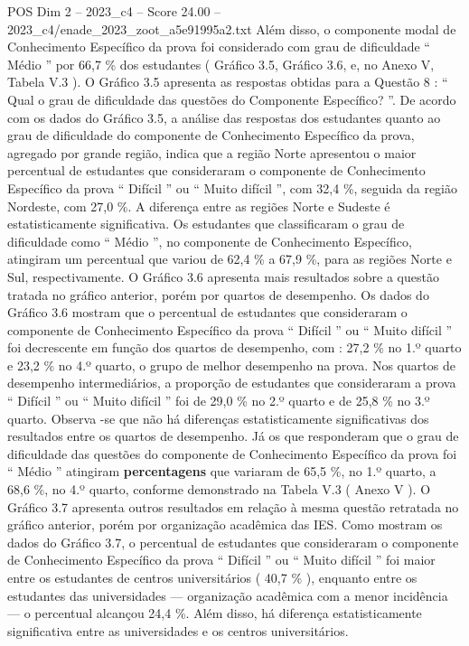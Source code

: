 \begin{textsample}{POS Dim 2 – 2023\_c4 – Score 24.00 – 2023\_c4/enade\_2023\_zoot\_a5e91995a2.txt}
Além disso, o componente modal de Conhecimento Específico da prova foi considerado com grau de dificuldade “ Médio ” por 66,7 \% dos estudantes ( Gráfico 3.5, Gráfico 3.6, e, no Anexo V, Tabela V.3 ).
O Gráfico 3.5 apresenta as respostas obtidas para a Questão 8 : “ Qual o grau de dificuldade das questões do Componente Específico? ”.
De acordo com os dados do Gráfico 3.5, a análise das respostas dos estudantes quanto ao grau de dificuldade do componente de Conhecimento Específico da prova, agregado por grande região, indica que a região Norte apresentou o maior percentual de estudantes que consideraram o componente de Conhecimento Específico da prova “ Difícil ” ou “ Muito difícil ”, com 32,4 \%, seguida da região Nordeste, com 27,0 \%.
A diferença entre as regiões Norte e Sudeste é estatisticamente significativa.
Os estudantes que classificaram o grau de dificuldade como “ Médio ”, no componente de Conhecimento Específico, atingiram um percentual que variou de 62,4 \% a 67,9 \%, para as regiões Norte e Sul, respectivamente.
O Gráfico 3.6 apresenta mais resultados sobre a questão tratada no gráfico anterior, porém por quartos de desempenho.
Os dados do Gráfico 3.6 mostram que o percentual de estudantes que consideraram o componente de Conhecimento Específico da prova “ Difícil ” ou “ Muito difícil ” foi decrescente em função dos quartos de desempenho, com : 27,2 \% no 1.º quarto e 23,2 \% no 4.º quarto, o grupo de melhor desempenho na prova.
Nos quartos de desempenho intermediários, a proporção de estudantes que consideraram a prova “ Difícil ” ou “ Muito difícil ” foi de 29,0 \% no 2.º quarto e de 25,8 \% no 3.º quarto.
Observa -se que não há diferenças estatisticamente significativas dos resultados entre os quartos de desempenho.
Já os que responderam que o grau de dificuldade das questões do componente de Conhecimento Específico da prova foi “ Médio ” atingiram \textbf{percentagens} que variaram de 65,5 \%, no 1.º quarto, a 68,6 \%, no 4.º quarto, conforme demonstrado na Tabela V.3 ( Anexo V ).
O Gráfico 3.7 apresenta outros resultados em relação à mesma questão retratada no gráfico anterior, porém por organização acadêmica das IES.
Como mostram os dados do Gráfico 3.7, o percentual de estudantes que consideraram o componente de Conhecimento Específico da prova “ Difícil ” ou “ Muito difícil ” foi maior entre os estudantes de centros universitários ( 40,7 \% ), enquanto entre os estudantes das universidades — organização acadêmica com a menor incidência — o percentual alcançou 24,4 \%.
Além disso, há diferença estatisticamente significativa entre as universidades e os centros universitários.

\end{textsample}

